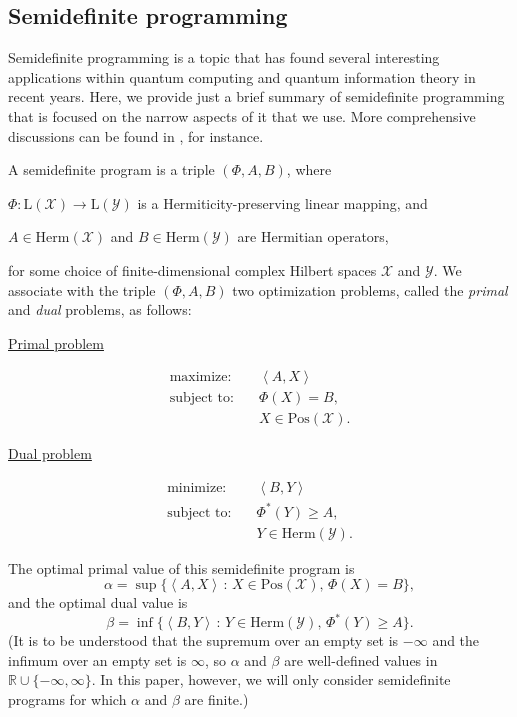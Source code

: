 \documentclass[11pt,letterpaper]{article}
\theoremstyle{definition}
\newcommand{\ip}[2]{\left\langle #1 , #2\right\rangle}
\newcommand{\setft}[1]{\mathrm{#1}}
\newcommand{\lin}[1]{\setft{L}\left(#1\right)}
\newcommand{\herm}[1]{\setft{Herm}\left(#1\right)}
\newcommand{\pos}[1]{\setft{Pos}\left(#1\right)}
\def\real{\mathbb{R}}
\newenvironment{mylist}[1]{\begin{list}{}{
	\setlength{\leftmargin}{#1}
	\setlength{\rightmargin}{0mm}
	\setlength{\labelsep}{2mm}
	\setlength{\labelwidth}{8mm}
	\setlength{\itemsep}{0mm}}}
	{\end{list}}
\def\X{\mathcal{X}}
\def\Y{\mathcal{Y}}
\begin{document}
\subsection{Semidefinite programming}

Semidefinite programming is a topic that has found several interesting
applications within quantum computing and quantum information theory
in recent years.
Here, we provide just a brief summary of semidefinite programming that
is focused on the narrow aspects of it that we use.
More comprehensive discussions can be found in
\cite{VandenbergheB96,Lovasz03,deKlerk02,BoydV04}, for instance.

A semidefinite program is a triple $(\Phi,A,B)$, where
\begin{mylist}{\parindent}
\item[1.] 
$\Phi: \lin{\X} \rightarrow \lin{\Y}$ is a Hermiticity-preserving
  linear mapping, and
\item[2.] $A\in\herm{\X}$ and $B\in\herm{\Y}$ are Hermitian operators,
\end{mylist}
for some choice of finite-dimensional complex Hilbert spaces $\X$ and $\Y$.
We associate with the triple $(\Phi,A,B)$ two optimization problems,
called the \emph{primal} and \emph{dual} problems, as follows:
\begin{center}
  \begin{minipage}{2.6in}
    \centerline{\underline{Primal problem}}\vspace{-7mm}
    \begin{align*}
      \text{maximize:}\quad & \ip{A}{X}\\
      \text{subject to:}\quad & \Phi(X) = B,\\
      & X\in\pos{\X}.
    \end{align*}
  \end{minipage}
  \hspace*{13mm}
  \begin{minipage}{2.6in}
    \centerline{\underline{Dual problem}}\vspace{-7mm}
    \begin{align*}
      \text{minimize:}\quad & \ip{B}{Y}\\
      \text{subject to:}\quad & \Phi^{\ast}(Y) \geq A,\\
      & Y\in\herm{\Y}.
    \end{align*}
  \end{minipage}
\end{center}
\noindent
The optimal primal value of this semidefinite program is
\[
\alpha = \sup\{\ip{A}{X}\,:\,X\in\pos{\X},\,\Phi(X) = B\},
\]
and the optimal dual value is
\[
\beta = \inf\{\ip{B}{Y}\,:\,Y\in\herm{\Y},\,\Phi^{\ast}(Y) \geq A\}.
\]
(It is to be understood that the supremum over an empty set is
$-\infty$ and the infimum over an empty set is $\infty$, so $\alpha$
and $\beta$ are well-defined values in 
$\real\cup\{-\infty,\infty\}$.
In this paper, however, we will only consider semidefinite programs for
which $\alpha$ and $\beta$ are finite.)
\end{document}
